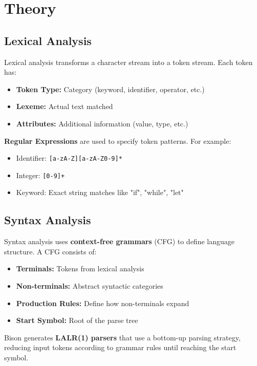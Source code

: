 \documentclass[12pt,a4paper]{article}
\begin{document}
\section{Theory}

\subsection{Lexical Analysis}

Lexical analysis transforms a character stream into a token stream. Each token has:
\begin{itemize}
    \item \textbf{Token Type:} Category (keyword, identifier, operator, etc.)
    \item \textbf{Lexeme:} Actual text matched
    \item \textbf{Attributes:} Additional information (value, type, etc.)
\end{itemize}

\textbf{Regular Expressions} are used to specify token patterns. For example:
\begin{itemize}
    \item Identifier: \texttt{[a-zA-Z][a-zA-Z0-9]*}
    \item Integer: \texttt{[0-9]+}
    \item Keyword: Exact string matches like "if", "while", "let"
\end{itemize}

\subsection{Syntax Analysis}

Syntax analysis uses \textbf{context-free grammars} (CFG) to define language structure. A CFG consists of:
\begin{itemize}
    \item \textbf{Terminals:} Tokens from lexical analysis
    \item \textbf{Non-terminals:} Abstract syntactic categories
    \item \textbf{Production Rules:} Define how non-terminals expand
    \item \textbf{Start Symbol:} Root of the parse tree
\end{itemize}

Bison generates \textbf{LALR(1) parsers} that use a bottom-up parsing strategy, reducing input tokens according to grammar rules until reaching the start symbol.
\end{document}
